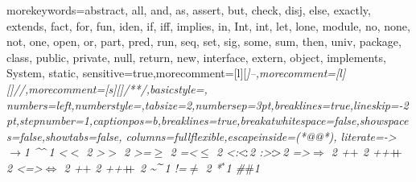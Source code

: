 {morekeywords={abstract, all, and, as, assert, but, check, disj, else, exactly, extends, fact, for, fun, iden, if, iff, implies, in, Int, int, let, lone, module, no, none, not, one, open, or, part, pred, run, seq, set, sig, some, sum, then, univ, package, class, public, private, null, return, new, interface, extern, object, implements, System, static},
sensitive=true,morecomment=[l][\small\itshape]{--},morecomment=[l][\small\itshape]{//},morecomment=[s][\small\itshape]{/*}{*/},basicstyle=\small,
numbers=left,numberstyle=\scriptsize,tabsize=2,numbersep=3pt,breaklines=true,lineskip=-2pt,stepnumber=1,captionpos=b,breaklines=true,breakatwhitespace=false,showspaces=false,showtabs=false,
columns=fullflexible,escapeinside={(*@}{@*)},
literate={->}{{$\to$}}1 {^}{{$\mspace{-3mu}\widehat{\quad}\mspace{-3mu}$}}1
{<}{$<$ }2 {>}{$>$ }2 {>=}{$\geq$ }2 {=<}{$\leq$ }2
{<:}{{$<\mspace{-3mu}:$}}2 {:>}{{$:\mspace{-3mu}>$}}2
{=>}{{$\Rightarrow$ }}2 {+}{$+$ }2 {++}{{$+\mspace{-8mu}+$ }}2
{<=>}{{$\Leftrightarrow$ }}2 {+}{$+$ }2 {++}{{$+\mspace{-8mu}+$ }}2
{\~}{{$\mspace{-3mu}\widetilde{\quad}\mspace{-3mu}$}}1
{!=}{$\neq$ }2 {*}{${}^{\ast}$}1 %
{\#}{$\#$}1
}
\lstset{language=Java,numbersep=5pt,frame=single}
